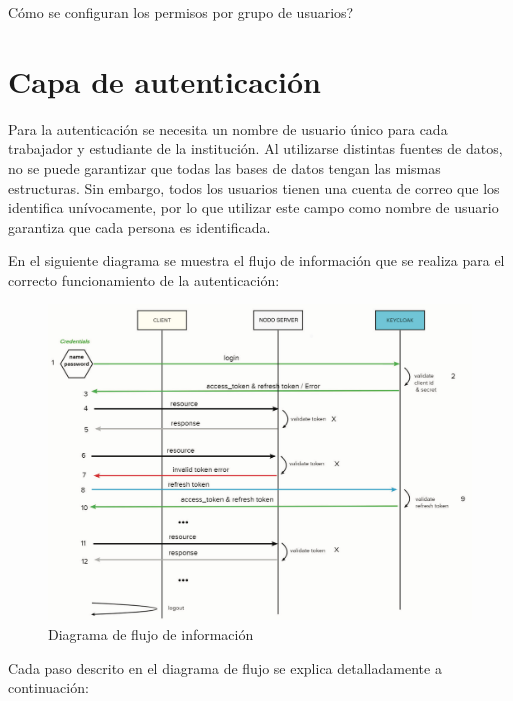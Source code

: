  

Cómo se configuran los permisos por grupo de usuarios?

\section*{Capa de autenticación}


Para la autenticación se necesita un nombre de usuario único para cada trabajador y estudiante de la institución. Al utilizarse distintas fuentes de datos, no se puede garantizar que todas las bases de datos tengan las mismas estructuras. Sin embargo, todos los usuarios tienen una cuenta de correo que los identifica unívocamente, por lo que utilizar este campo como nombre de usuario garantiza que cada persona es identificada.

En el siguiente diagrama se muestra el flujo de información que se realiza para el correcto funcionamiento de la autenticación:

\begin{figure}[H]
	\centering	
	\hspace*{-0.3in}
	\includegraphics[width=1.1\linewidth]{"Graphics/diagrama de flujo del prototipo del servicio"}
	\caption{Diagrama de flujo de información}
	\label{fig:diagrama-de-flujo-del-prototipo-del-servicio}
\end{figure}

Cada paso descrito en el diagrama de flujo se explica detalladamente a continuación: 

